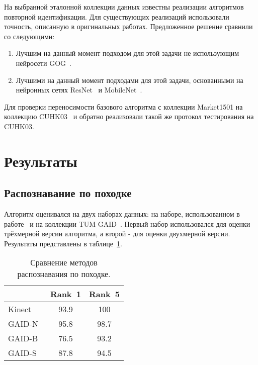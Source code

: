 \documentclass[a4paper,twoside,11pt]{article}
\numberwithin{equation}{section}
\begin{document}
На выбранной эталонной коллекции данных известны реализации алгоритмов повторной идентификации. Для существующих реализаций использовали точность, описанную в оригинальных работах. Предложенное решение сравнили со следующими:

\begin{enumerate}
    \item Лучшим на данный момент подходом для этой задачи не использующим нейросети GOG~\cite{karanam2016systematic}.
    \item Лучшими на данный момент подходами для этой задачи, основанными на нейронных сетях ResNet~\cite{hermans2017defense} и MobileNet~\cite{zhang2017deep}.
\end{enumerate}

Для проверки переносимости базового алгоритма с коллекции Market1501 на коллекцию CUHK03~\cite{li2014deepreid} и обратно реализовали такой же протокол тестирования на CUHK03.

\section{Результаты}

\subsection{Распознавание по походке}

Алгоритм оценивался на двух наборах данных: на наборе, использованном в работе~\cite{andersson2015person} и на коллекции TUM GAID~\cite{hofmann2014tum}. Первый набор использовался для оценки трёхмерной версии алгоритма, а второй - для оценки двухмерной версии. Результаты представлены в таблице~\ref{experimentalresults}.

\begin{table}[ht]
    \caption{Сравнение методов распознавания по походке.}
    \label{experimentalresults}
    \centering\medskip%
    \begin{tabular}{ l c c } 
        \hline
         & Rank~1 & Rank~5 \\
        \hline
        Kinect~\cite{andersson2015person} & 93.9 & 100 \\
        GAID-N~\cite{hofmann2014tum} & 95.8 & 98.7 \\
        GAID-B~\cite{hofmann2014tum} & 76.5 & 93.2 \\
        GAID-S~\cite{hofmann2014tum} & 87.8 & 94.5 \\
        \hline
    \end{tabular}
\end{table}
\end{document}
